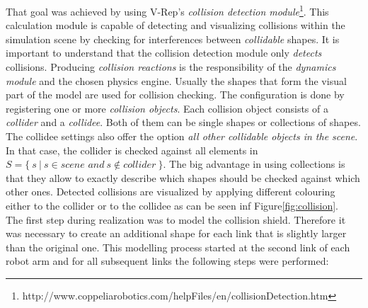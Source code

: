 That goal was achieved by using V-Rep's \emph{collision detection module}\footnote{http://www.coppeliarobotics.com/helpFiles/en/collisionDetection.htm}. This calculation module is capable of detecting and visualizing collisions within the simulation scene by checking for interferences between \emph{collidable} shapes. It is important to understand that the collision detection module only \textit{detects} collisions. Producing \emph{collision reactions} is the responsibility of the \emph{dynamics module} and the chosen physics engine. Usually the shapes that form the visual part of the model are used for collision checking. The configuration is done by registering one or more \emph{collision objects}. Each collision object consists of a \emph{collider} and a \emph{collidee}. Both of them can be single shapes or collections of shapes. The collidee settings also offer the option \emph{all other collidable objects in the scene}. In that case, the collider is checked against all elements in $S=\{~s~|~s\in\textit{scene and}~s\notin\textit{collider}~\}$. The big advantage in using collections is that they allow to exactly describe which shapes should be checked against which other ones. Detected collisions are visualized by applying different colouring either to the collider or to the collidee as can be seen inf Figure\ref{fig:collision}. \\

The first step during realization was to model the collision shield. Therefore it was necessary to create an additional shape for each link that is slightly larger than the original one. This modelling process started at the second link of each robot arm and for all subsequent links the following steps were performed:

